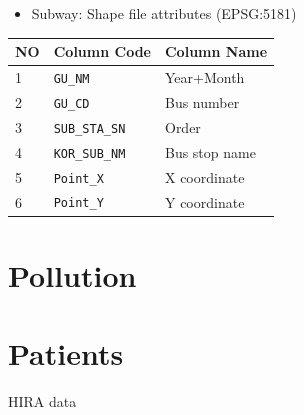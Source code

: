 \documentclass[]{book}
\providecommand{\tightlist}{%
  \setlength{\itemsep}{0pt}\setlength{\parskip}{0pt}}
\begin{document}
\begin{itemize}
\tightlist
\item
  Subway: Shape file attributes (EPSG:5181)
\end{itemize}

\begin{longtable}[]{@{}lll@{}}
\toprule
NO & Column Code & Column Name\tabularnewline
\midrule
\endhead
1 & \texttt{GU\_NM} & Year+Month\tabularnewline
2 & \texttt{GU\_CD} & Bus number\tabularnewline
3 & \texttt{SUB\_STA\_SN} & Order\tabularnewline
4 & \texttt{KOR\_SUB\_NM} & Bus stop name\tabularnewline
5 & \texttt{Point\_X} & X coordinate\tabularnewline
6 & \texttt{Point\_Y} & Y coordinate\tabularnewline
\bottomrule
\end{longtable}

\chapter{Pollution}\label{pollution}

\chapter{Patients}\label{patients}

HIRA data


\end{document}
